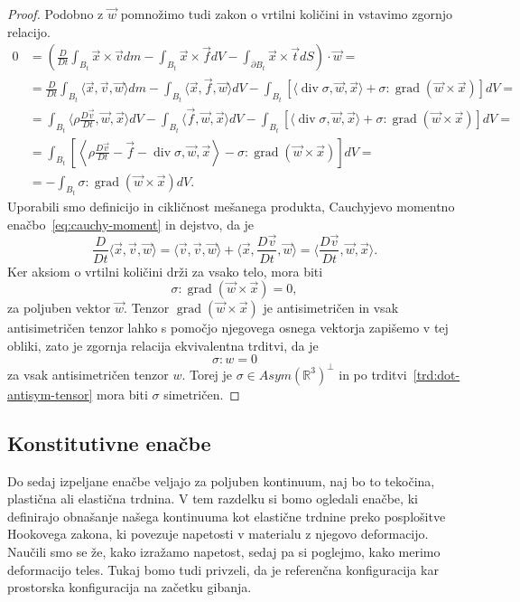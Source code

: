 \documentclass[12pt,a4paper,twoside]{article}
\theoremstyle{definition} %
\theoremstyle{plain} %
\numberwithin{equation}{section}
\newcommand{\R}{\mathbb R}
\renewcommand{\div}{\operatorname{div}}
\newcommand{\grad}{\operatorname{grad}}
\newcommand{\DD}[2]{\ensuremath{\frac{D #1}{D #2}}}
\newcommand{\DDt}[1]{\DD{#1}{t}}
\newcommand{\vv}{\vec{v}}
\newcommand{\vt}{\vec{t}}
\newcommand{\vw}{\vec{w}}
\newcommand{\vf}{\vec{f}}
\newcommand{\vx}{\vec{x}}
\newcommand{\ts}{\sigma}
\begin{document}
\begin{proof}
Podobno z $\vw$ pomnožimo tudi zakon o vrtilni količini in vstavimo zgornjo
relacijo.
\begin{align*}
  0 &= \left(\DDt{}\int_{B_t}\vx \times \vv dm - \int_{B_t} \vx \times \vf dV -
  \int_{\partial B_t} \vx\times\vt dS\right)\cdot \vw = \\ &=
  \DDt{}\int_{B_t}\langle \vx, \vv, \vw\rangle  dm - \int_{B_t} \langle \vx,
  \vf, \vw\rangle dV - \int_{B_t} [\langle \div \ts, \vw, \vx\rangle +  \ts :
  \grad (\vw \times \vx)] dV = \\ &=
  \int_{B_t}\langle \rho \DDt\vv, \vw, \vx \rangle  dV - \int_{B_t} \langle \vf,
  \vw, \vx\rangle dV - \int_{B_t} [\langle \div \ts, \vw, \vx\rangle +  \ts :
  \grad (\vw \times \vx)] dV = \\ &=
\int_{B_t}\left[ \left\langle\rho \DDt\vv - \vf - \div \ts, \vw, \vx\right\rangle -  \ts : \grad
  (\vw \times \vx)\right] dV = \\ &=
- \int_{B_t} \ts : \grad (\vw \times \vx) dV.
\end{align*}
Uporabili smo definicijo in cikličnost mešanega produkta, Cauchyjevo momentno
enačbo~\eqref{eq:cauchy-moment} in dejstvo, da je
\[
  \DDt{}\langle \vx, \vv, \vw \rangle =
  \langle \vv, \vv, \vw \rangle +
  \langle \vx, \DDt\vv, \vw \rangle =
  \langle \DDt\vv, \vw, \vx \rangle.
\]
Ker aksiom o vrtilni količini drži za vsako telo, mora biti
\[
  \ts : \grad (\vw \times \vx) = 0,
\]
za poljuben vektor $\vw$. Tenzor $\grad (\vw \times \vx)$ je antisimetričen in
vsak antisimetričen tenzor lahko s pomočjo njegovega osnega vektorja zapišemo v
tej obliki, zato je zgornja relacija ekvivalentna trditvi, da je
\[ \ts : w = 0\] za vsak antisimetričen tenzor $w$.
Torej je $\ts \in Asym(\R^3)^\perp$ in po trditvi~\ref{trd:dot-antisym-tensor}
mora biti $\ts$ simetričen.
\end{proof}

\subsection{Konstitutivne enačbe}
Do sedaj izpeljane enačbe veljajo za poljuben kontinuum, naj bo to tekočina, plastična ali elastična
trdnina. V tem razdelku si bomo ogledali enačbe, ki definirajo obnašanje našega kontinuuma kot
elastične trdnine preko posplošitve Hookovega zakona, ki povezuje napetosti v materialu z njegovo
deformacijo. Naučili smo se že, kako izražamo napetost, sedaj pa si poglejmo, kako merimo
deformacijo teles.  Tukaj bomo tudi privzeli, da je referenčna konfiguracija kar prostorska
konfiguracija na začetku gibanja.
\end{document}
